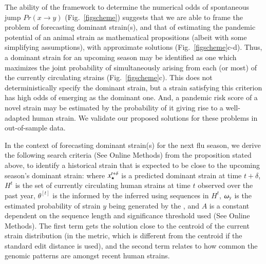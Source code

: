 \documentclass[onecolumn, compsoc,10pt]{IEEEtran}
\def\METHODS{Online Methods\xspace}
\begin{document}



The ability of the \enet framework to determine the numerical odds of spontaneous jump $ Pr(x \rightarrow y)$ (Fig.~\ref{figscheme}) suggests that we are able to frame the problem of forecasting  dominant strain(s), and that of estimating the  pandemic potential of an animal strain as  mathematical propositions (albeit with some simplifying assumptions), with  approximate solutions (Fig.~\ref{figscheme}c-d). Thus,  a dominant strain for an upcoming  season may be identified as one which maximizes the joint probability of simultaneously arising from each (or most)  of the currently circulating strains (Fig.~\ref{figscheme}c).  This does not deterministically specify the dominant strain, but a strain satisfying this criterion  has  high odds of emerging as the dominant one. And, a pandemic risk score of a novel strain may be estimated by the probability of it giving rise to a well-adapted human strain.  We validate  our proposed solutions for these problems in out-of-sample data.
%

In the context of  forecasting  dominant strain(s) for the next flu season,  we derive the following search criteria (See \METHODS) from the proposition stated above, to identify a historical strain that is expected to be close to the upcoming season's dominant strain:
%
%
where $x_\star^{t+\delta}$ is a predicted dominant strain  at time $t+\delta$, $H^t$ is the set of currently circulating human strains at time $t$  observed over the past year, $\theta^{[t]}$ is the \qdist informed by the inferred \enet using sequences in $H^t$, $\omega_{y}$ is the estimated probability of strain $y$ being generated by the \enet, and $A$ is a constant dependent on the sequence length and significance threshold used (See \METHODS). The first term gets the solution close to the centroid of the current strain distribution (in the \qdist metric, which is different from the centroid if the standard edit distance is used), and the second term relates to how common the genomic patterns are amongst recent human strains. 
\end{document}
